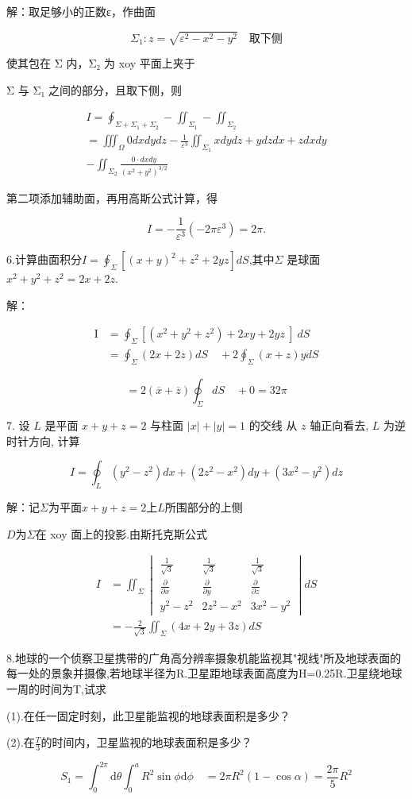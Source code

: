 \documentclass{article}
\begin{document}
解：取足够小的正数ε，作曲面

$$\Sigma_1 : z = \sqrt{\varepsilon^2 - x^2 - y^2} \quad \text{取下侧}$$

使其包在 Σ 内，Σ₂ 为 xoy 平面上夹于

Σ 与 Σ₁ 之间的部分，且取下侧，则

$$\begin{gathered}I=\oint_{\Sigma+\Sigma_1+\Sigma_2}-\iint_{\Sigma_1}-\iint_{\Sigma_2}\\=\iiint_\Omega0dxdydz-\frac{1}{\varepsilon^3}\iint_{\Sigma_1}xdydz+ydzdx+zdxdy\\-\iint_{\Sigma_2}\frac{0\cdot dxdy}{\left(x^2+y^2\right)^{3/2}}\end{gathered}$$

第二项添加辅助面，再用高斯公式计算，得

$$I = -\frac{1}{\varepsilon^3}(-2\pi\varepsilon^3)= 2\pi.$$

\newpage

6.计算曲面积分$I=\oint_{\Sigma}[(x+y)^2+z^2+2yz]dS$,其中$\Sigma$ 是球面 $x^2+y^2+z^2=2x+2z.$

解：

$$\begin{aligned}\text{I}&=\oint_{\Sigma}[(x^{2}+y^{2}+z^{2})+2xy+2yz\:]\:dS\\&=\oint_{\Sigma}(2x+2z)dS\quad+2\oint_{\Sigma}(x+z)ydS\end{aligned}$$

$$=2(\overline{x}+\overline{z})\oint_{\Sigma}dS\quad+0=32\pi$$

\newpage

7. 设 $L$ 是平面 $x + y + z = 2$ 与柱面 $|x| + |y| = 1$ 的交线 从 $z$ 轴正向看去, $L$ 为逆时针方向, 计算

$$I = \oint_L (y^2 - z^2)dx + (2z^2 - x^2)dy + (3x^2 - y^2)dz$$

解：记$\Sigma$为平面$x+y+z=2$上$L$所围部分的上侧

$D$为$\Sigma$在 xoy 面上的投影.由斯托克斯公式

$$\begin{aligned}I&=\iint_{\Sigma}\begin{vmatrix}\frac{1}{\sqrt{3}}&\frac{1}{\sqrt{3}}&\frac{1}{\sqrt{3}}\\\frac{\partial}{\partial x}&\frac{\partial}{\partial y}&\frac{\partial}{\partial z}\\y^{2}-z^{2}&2z^{2}-x^{2}&3x^{2}-y^{2}\end{vmatrix}dS\\&=-\frac{2}{\sqrt{3}}\iint_{\Sigma}(4x+2y+3z)dS\end{aligned}$$

\newpage

8.地球的一个侦察卫星携带的广角高分辨率摄象机能监视其"视线"所及地球表面的每一处的景象并摄像,若地球半径为R.卫星距地球表面高度为H=0.25R.卫星绕地球一周的时间为T,试求

(1).在任一固定时刻，此卫星能监视的地球表面积是多少？

(2).在$\frac T3$的时间内，卫星监视的地球表面积是多少？

$$S_1=\int_0^{2\pi}\mathrm{d}\theta\int_0^aR^2\sin\phi\mathrm{d}\phi\quad=2\pi R^2(1-\cos\alpha)=\frac{2\pi}{5}R^2$$
\end{document}
